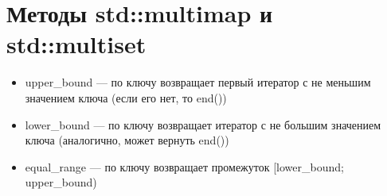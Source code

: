 \documentclass{article}
\begin{document}
\section{Методы std::multimap и std::multiset}
\begin{itemize}
    \item upper\_bound — по ключу возвращает первый итератор с не меньшим значением ключа (если его нет, то end())
    \item lower\_bound — по ключу возвращает итератор с не большим значением ключа (аналогично, может вернуть end())
    \item equal\_range — по ключу возвращает промежуток [lower\_bound; upper\_bound)
\end{itemize}
\end{document}
